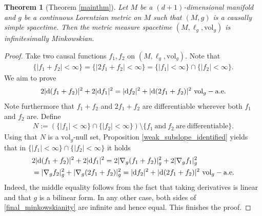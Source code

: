 \documentclass[a4paper,10pt]{article}
\newtheorem{theorem}{Theorem}[section]
\numberwithin{equation}{section}
\newcommand{\vol}{\mathrm{vol}}
\newcommand{\di}{{\rm d}}
\begin{document}
\begin{theorem}[Theorem \ref{mainthm}]
    Let $M$ be a $(d+1)$-dimensional manifold and $g$ be a continuous Lorentzian metric on $M$ such that $(M, g)$ is a causally simple spacetime.
    Then the metric measure spacetime $(M, \ell_g, \vol_g)$ is infinitesimally Minkowskian. 
\end{theorem}
\begin{proof}
    Take two causal functions $f_1, f_2$ on $(M, \ell_g, \vol_g)$. Note that
    \begin{align*}
        \{|f_1+f_2|<\infty\}= \{|2f_1+f_2|<\infty\} = \{|f_1|<\infty\}\cap \{|f_2|<\infty\}.
    \end{align*}
    We aim to prove
    \begin{align}\label{final_minkowskianity}
        2|\di(f_1+f_2)|^2+ 2|\di f_1|^2 = |\di f_2|^2 + |\di (2f_1+f_2)|^2 \ \vol_g-\mathrm{a.e.}
    \end{align}
     Note furthermore that $f_1+f_2$ and $2f_1+f_2$ are differentiable wherever both $f_1$ and $f_2$ are. 
    Define
    \begin{align}
        N:= (\{|f_1|<\infty\}\cap \{|f_2|<\infty\})\setminus \{f_1 \ \mathrm{and}\ f_2\ \mathrm{are\ differentiable}\}.
    \end{align}
    Using that $N$ is a $\vol_g$-null set, Proposition \ref{weak_subslope_identified} yields that in $\{|f_1|<\infty\}\cap \{|f_2|<\infty\}$ it holds
    \begin{align}
        &2|\di(f_1+f_2)|^2+ 2|\di f_1|^2 = 2|\nabla_g(f_1+f_2)|_g^2+ 2|\nabla_g f_1|_g^2 \nonumber\\
        &= |\nabla_g f_2|_g^2 + |\nabla_g (2f_1+f_2)|_g^2=  |\di f_2|^2 + |\di (2f_1+f_2)|^2 \ \vol_g-\mathrm{a.e.}
    \end{align}
    Indeed, the middle equality follows from the fact that taking derivatives is linear and that $g$ is a bilinear form. In any other case, both sides of \eqref{final_minkowskianity} are infinite and hence equal. This finishes the proof.
\end{proof}

{}

%

\end{document}
